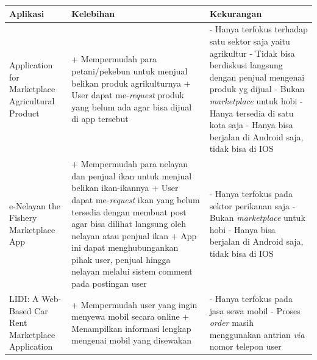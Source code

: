 \documentclass[a4paper]{article}
\begin{document}
\begin{longtable}{|p{3cm}|p{5cm}|p{5cm}|}
    \hline
    Aplikasi & Kelebihan                                                                                                                 & Kekurangan \\
    \hline
    Application for Marketplace Agricultural Product
             & + Mempermudah para petani/pekebun untuk menjual belikan produk agrikulturnya \newline
    + User dapat me-\textit{request} produk yang belum ada agar bisa dijual di app tersebut \newline
             & - Hanya terfokus terhadap satu sektor saja yaitu agrikultur \newline
    - Tidak bisa berdiskusi langsung dengan penjual mengenai produk yg dijual \newline
    - Bukan \textit{marketplace} untuk hobi \newline
    - Hanya tersedia di satu kota saja \newline
    - Hanya bisa berjalan di Android saja, tidak bisa di IOS                                                                                     \\
    \hline
    e-Nelayan the Fishery Marketplace App
             & + Mempermudah para nelayan dan penjual ikan untuk menjual belikan ikan-ikannya \newline
    + User dapat me-\textit{request} ikan yang belum tersedia dengan membuat post agar bisa dilihat langsung oleh nelayan atau penjual ikan \newline
    + App ini dapat menghubungankan pihak user, penjual hingga nelayan melalui sistem comment pada postingan user \newline
             & - Hanya terfokus pada sektor perikanan saja \newline
    - Bukan \textit{marketplace} untuk hobi \newline
    - Hanya bisa berjalan di Android saja, tidak bisa di IOS                                                                                     \\
    \hline
    LIDI: A Web-Based Car Rent Marketplace Application
             & + Mempermudah user yang ingin menyewa mobil secara online \newline
    + Menampilkan informasi lengkap mengenai mobil yang disewakan \newline
             & - Hanya terfokus pada jasa sewa mobil \newline
    - Proses \textit{order} masih menggunakan antrian \textit{via} nomor telepon user \newline

\end{longtable}
\end{document}
